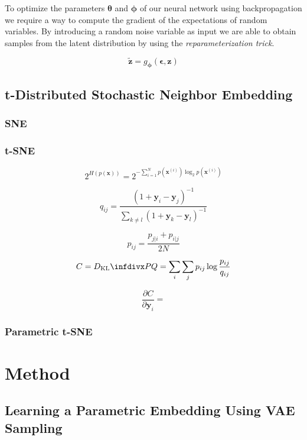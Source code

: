 To optimize the parameters $\mathbf{\theta}$ and $\mathbf{\phi}$ of our neural network using backpropagation we require a way to compute the gradient of the expectations of random variables. By introducing a random noise variable as input we are able to obtain samples from the latent distribution by using the \textit{reparameterization trick}.

$$\widetilde{\mathbf{z}} = g_{\mathbf{\phi}}(\mathbf{\epsilon}, \mathbf{z})$$

\newpage \phantom{x}
\newpage \phantom{x}
\newpage

\section{t-Distributed Stochastic Neighbor Embedding}
\label{section:tsne}
\subsection{SNE}
\label{subsection:sne}
\newpage

\subsection{t-SNE}
\label{subsection:tsne}

$$2^{H(p(\mathbf{x}))} = 2^{-\sum_{i=1}^{N} p(\mathbf{x}^{(i)}) \log_2 p(\mathbf{x}^{(i)})}$$

$$q_{ij} = \frac{(1 + \mathbf{y}_i - \mathbf{y}_j)^{-1}}{\sum_{k \neq l} (1 + \mathbf{y}_k - \mathbf{y}_l)^{-1}}$$

$$p_{ij} = \frac{p_{j \vert i} + p_{i \vert j}}{2 N}$$

$$C = \dkl{P}{Q} = \sum_i \sum_j p_{ij} \log \frac{p_{ij}}{q_{ij}}$$

$$\frac{\partial C}{\partial \mathbf{y}_i} = $$

\newpage \phantom{x}
\newpage \phantom{x}
\newpage

\subsection{Parametric t-SNE}
\label{subsection:parametric_tsne}
\newpage

\chapter{Method}
\label{ch:method}

\section{Learning a Parametric Embedding Using VAE Sampling}
\newpage \phantom{x}
\newpage \phantom{x}
\newpage

